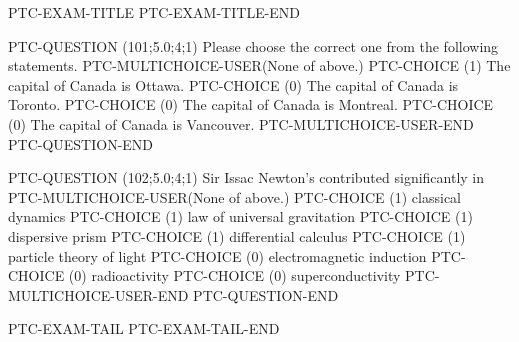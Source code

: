 \documentclass[12pt]{article}
\begin{document}
PTC-EXAM-TITLE
PTC-EXAM-TITLE-END


PTC-QUESTION  (101;5.0;4;1)
Please choose the correct one from the following statements.
PTC-MULTICHOICE-USER(None of above.)
   PTC-CHOICE (1) The capital of Canada is Ottawa.
   PTC-CHOICE (0) The capital of Canada is Toronto.
   PTC-CHOICE (0) The capital of Canada is Montreal. 
   PTC-CHOICE (0) The capital of Canada is Vancouver.
PTC-MULTICHOICE-USER-END
PTC-QUESTION-END


PTC-QUESTION  (102;5.0;4;1)
Sir Issac Newton's contributed significantly in 
PTC-MULTICHOICE-USER(None of above.)
   PTC-CHOICE (1) classical dynamics
   PTC-CHOICE (1) law of universal gravitation
   PTC-CHOICE (1) dispersive prism
   PTC-CHOICE (1) differential calculus
   PTC-CHOICE (1) particle theory of light
   PTC-CHOICE (0) electromagnetic induction
   PTC-CHOICE (0) radioactivity
   PTC-CHOICE (0) superconductivity
PTC-MULTICHOICE-USER-END
PTC-QUESTION-END



PTC-EXAM-TAIL
PTC-EXAM-TAIL-END
\end{document}
